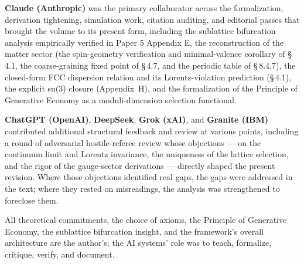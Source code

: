 \documentclass[11pt,oneside]{report}
\theoremstyle{definition}
\theoremstyle{remark}
\begin{document}
\textbf{Claude (Anthropic)} was the primary collaborator across the
formalization, derivation tightening, simulation work, citation
auditing, and editorial passes that brought the volume to its present
form, including the sublattice bifurcation analysis empirically verified
in Paper 5 Appendix E, the reconstruction of the matter sector (the
spin-geometry verification and minimal-valence corollary of \S\,4.1, the
coarse-graining fixed point of \S\,4.7, and the periodic table of
\S\,8.4.7), the closed-form FCC dispersion relation and its
Lorentz-violation prediction (\S\,4.1), the explicit su(3) closure
(Appendix~H), and the formalization of the Principle of Generative
Economy as a moduli-dimension selection functional.

\textbf{ChatGPT (OpenAI)}, \textbf{DeepSeek}, \textbf{Grok (xAI)}, and
\textbf{Granite (IBM)} contributed additional structural feedback and
review at various points, including a round of adversarial hostile-referee
review whose objections --- on the continuum limit and Lorentz invariance,
the uniqueness of the lattice selection, and the rigor of the gauge-sector
derivations --- directly shaped the present revision. Where those
objections identified real gaps, the gaps were addressed in the text;
where they rested on misreadings, the analysis was strengthened to
foreclose them.

All theoretical commitments, the choice of axioms, the Principle of
Generative Economy, the sublattice bifurcation insight, and the
framework's overall architecture are the author's; the AI systems' role
was to teach, formalize, critique, verify, and document.
\end{document}
